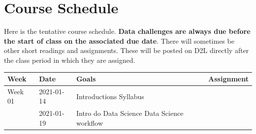\documentclass[
]{book}
\begin{document}
\hypertarget{course-schedule}{%
\section{Course Schedule}\label{course-schedule}}

Here is the tentative course schedule. \textbf{Data challenges are always due before the start of class on the associated due date}. There will sometimes be other short readings and assignments. These will be posted on D2L directly after the class period in which they are assigned.

\begin{longtable}[]{@{}llll@{}}
\toprule
\begin{minipage}[b]{0.22\columnwidth}\raggedright
Week\strut
\end{minipage} & \begin{minipage}[b]{0.22\columnwidth}\raggedright
Date\strut
\end{minipage} & \begin{minipage}[b]{0.22\columnwidth}\raggedright
Goals\strut
\end{minipage} & \begin{minipage}[b]{0.22\columnwidth}\raggedright
Assignment\strut
\end{minipage}\tabularnewline
\midrule
\endhead
\begin{minipage}[t]{0.22\columnwidth}\raggedright
Week 01\strut
\end{minipage} & \begin{minipage}[t]{0.22\columnwidth}\raggedright
2021-01-14\strut
\end{minipage} & \begin{minipage}[t]{0.22\columnwidth}\raggedright
Introductions Syllabus\strut
\end{minipage} & \begin{minipage}[t]{0.22\columnwidth}\raggedright
\strut
\end{minipage}\tabularnewline
\begin{minipage}[t]{0.22\columnwidth}\raggedright
\strut
\end{minipage} & \begin{minipage}[t]{0.22\columnwidth}\raggedright
2021-01-19\strut
\end{minipage} & \begin{minipage}[t]{0.22\columnwidth}\raggedright
Intro do Data Science Data Science workflow\strut
\end{minipage} & \begin{minipage}[t]{0.22\columnwidth}\raggedright

\end{minipage}
\end{longtable}
\end{document}
